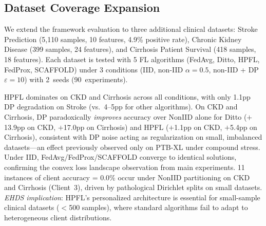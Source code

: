 \documentclass[conference]{IEEEtran}
\begin{document}
\subsection{Dataset Coverage Expansion}
\label{sec:dataset_coverage}

We extend the framework evaluation to three additional clinical datasets: Stroke Prediction (5,110 samples, 10 features, 4.9\% positive rate), Chronic Kidney Disease (399 samples, 24 features), and Cirrhosis Patient Survival (418 samples, 18 features). Each dataset is tested with 5 FL algorithms (FedAvg, Ditto, HPFL, FedProx, SCAFFOLD) under 3 conditions (IID, non-IID $\alpha{=}0.5$, non-IID + DP $\varepsilon{=}10$) with 2~seeds (90~experiments).

\begin{table}[htbp]
\centering
\caption{Dataset Coverage Expansion: Mean Accuracy (\%) Across Seeds}
\label{tab:dataset_coverage}

\vspace{1mm}
\footnotesize{HPFL dominates on CKD and Cirrhosis across all conditions, with only 1.1pp DP degradation on Stroke (vs.\ 4--5pp for other algorithms). On CKD and Cirrhosis, DP paradoxically \textit{improves} accuracy over NonIID alone for Ditto ($+$13.9pp on CKD, $+$17.0pp on Cirrhosis) and HPFL ($+$1.1pp on CKD, $+$5.4pp on Cirrhosis), consistent with DP noise acting as regularization on small, imbalanced datasets---an effect previously observed only on PTB-XL under compound stress. Under IID, FedAvg/FedProx/SCAFFOLD converge to identical solutions, confirming the convex loss landscape observation from main experiments. 11 instances of client accuracy = 0.0\% occur under NonIID partitioning on CKD and Cirrhosis (Client~3), driven by pathological Dirichlet splits on small datasets. \textit{EHDS implication}: HPFL's personalized architecture is essential for small-sample clinical datasets ($<$500 samples), where standard algorithms fail to adapt to heterogeneous client distributions.}
\end{table}
\end{document}
